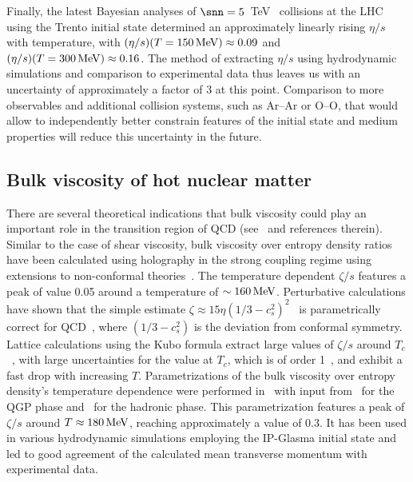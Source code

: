 Finally, the latest Bayesian analyses of $\snn=5$~TeV \pbpb\ 
  collisions at the LHC using the Trento initial state determined an 
  approximately linearly rising $\eta/s$ with temperature, with 
  $(\eta/s)(T=150\,{\rm MeV})\approx 0.09$ and 
  $(\eta/s)(T=300\,{\rm MeV})\approx 0.16$.
The method of extracting $\eta/s$ using hydrodynamic simulations and comparison 
  to experimental data thus leaves us with an uncertainty of approximately 
  a factor of $3$ at this point. 
Comparison to more observables and additional collision systems, 
  such as Ar--Ar or O--O, that would allow to independently better constrain 
  features of the initial state and medium properties will reduce this 
  uncertainty in the future. 


\subsection{Bulk viscosity of hot nuclear matter}
There are several theoretical indications that bulk viscosity could play 
  an important role in the transition region of QCD (see~\cite{Ryu:2017qzn} 
  and references therein). 
Similar to the case of shear viscosity, bulk viscosity over entropy density 
  ratios have been calculated using holography in the strong coupling regime 
  using extensions to non-conformal theories~\cite{Buchel:2007mf,Finazzo:2014cna}. 
The temperature dependent $\zeta/s$ features a peak of value 0.05 around a 
  temperature of $\sim 160\,{\rm MeV}$. 
Perturbative calculations have shown that the simple estimate 
  $\zeta\approx 15 \eta(1/3-c_s^2)^2$~\cite{Horsley:1985dz} is parametrically 
  correct for QCD~\cite{Arnold:2006fz}, where $(1/3-c_s^2)$ is the deviation 
  from conformal symmetry. 
Lattice calculations using the Kubo formula extract large values of $\zeta/s$ 
  around $T_c$~\cite{Karsch:2007jc,Meyer:2007dy}, with large uncertainties for 
  the value at $T_c$, which is of order 1~\cite{Kharzeev:2007wb}, and exhibit 
  a fast drop with increasing $T$.
Parametrizations of the bulk viscosity over entropy density's temperature 
  dependence were performed in~\cite{Denicol:2009am} with input from~\cite{Karsch:2007jc} 
  for the QGP phase and~\cite{NoronhaHostler:2008ju} for the hadronic phase. 
This parametrization features a peak of $\zeta/s$ around $T\approx 180\,{\rm MeV}$, 
  reaching approximately a value of 0.3. 
It has been used in various hydrodynamic simulations employing the IP-Glasma 
  initial state and led to good agreement of the calculated mean transverse 
  momentum with experimental data. 
